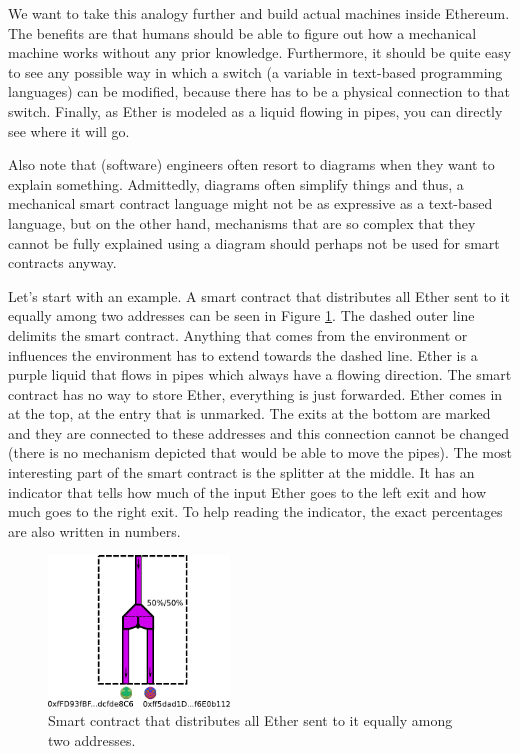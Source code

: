 \documentclass[11pt,letterpaper]{article}
\begin{document}
We want to take this analogy further and build actual machines inside Ethereum.
The benefits are that humans should be able to figure out how a mechanical
machine works without any prior knowledge. Furthermore, it should be quite
easy to see any possible way in which a switch (a variable in text-based
programming languages) can be modified, because there has to be a physical
connection to that switch. Finally, as Ether is modeled as a liquid flowing
in pipes, you can directly see where it will go.

Also note that (software) engineers often resort to diagrams when they
want to explain something. Admittedly, diagrams often simplify things and
thus, a mechanical smart contract language might not be as expressive as
a text-based language, but on the other hand, mechanisms that are so complex
that they cannot be fully explained using a diagram should perhaps not be used
for smart contracts anyway.

Let's start with an example. A smart contract that distributes
all Ether sent to it equally among two addresses can be seen in Figure \ref{splitter}.
The dashed outer line delimits the smart contract. Anything that comes from
the environment or influences the environment has to extend towards the dashed line.
Ether is a purple liquid that flows in pipes which always have a flowing direction.
The smart contract has no way to store Ether, everything is just forwarded.
Ether comes in at the top, at the entry that is unmarked. The exits at the
bottom are marked and they are connected to these addresses and this connection
cannot be changed (there is no mechanism depicted that would be able to move the
pipes). The most interesting part of the smart contract is the splitter at the
middle. It has an indicator that tells how much of the input Ether goes to the
left exit and how much goes to the right exit. To help reading the indicator,
the exact percentages are also written in numbers.

\begin{figure}
\center
\includegraphics[height=4cm]{splitter.pdf}
\caption{Smart contract that distributes all Ether sent to it equally among
two addresses.}
\label{splitter}
\end{figure}
\end{document}
